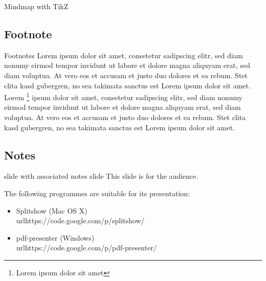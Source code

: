 \documentclass[xcolor={svgnames},12pt,aspectratio=169,handout]{beamer}
\begin{document}
\begin{frame}{Mindmap with TikZ}
    \centering
\end{frame}

\subsection{Footnote}

\begin{frame}{Footnotes}
    Lorem ipsum dolor sit amet, consetetur sadipscing elitr, sed diam nonumy eirmod tempor invidunt ut labore et dolore magna aliquyam erat, sed diam voluptua. At vero eos et accusam et justo duo dolores et ea rebum. Stet clita kasd gubergren, no sea takimata sanctus est Lorem ipsum dolor sit amet. Lorem \footnote{Lorem ipsum dolor sit amet} ipsum dolor sit amet, consetetur sadipscing elitr, sed diam nonumy eirmod tempor invidunt ut labore et dolore magna aliquyam erat, sed diam voluptua. At vero eos et accusam et justo duo dolores et ea rebum. Stet clita kasd gubergren, no sea takimata sanctus est Lorem ipsum dolor sit amet.
\end{frame}

\subsection{Notes}
\begin{frame}{slide with associated notes slide}
    This slide is for the audience.

    The following programmes are suitable for its presentation:

    \begin{itemize}
        \item Splitshow (Mac OS X)\\url{https://code.google.com/p/splitshow/}
        \item pdf-presenter (Windows)\\url{https://code.google.com/p/pdf-presenter/}
    \end{itemize}
\end{frame}
\end{document}
